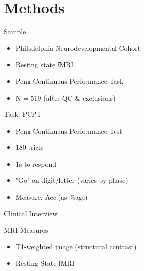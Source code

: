 \documentclass[presentation]{beamer}
\begin{document}
\section{Methods}
\label{sec:orgheadline14}
\begin{frame}[label={sec:orgheadline4}]{Sample}
\begin{itemize}
\item Philadelphia Neurodevelopmental Cohort
\item Resting state fMRI
\item Penn Continuous Performance Task
\item N = 519 (after QC \& exclusions)
\end{itemize}
\end{frame}
\begin{frame}[label={sec:orgheadline5}]{Task: PCPT}
\begin{itemize}
\item Penn Continuous Performance Test
\item 180 trials
\item 1s to respond
\item "Go" on digit/letter (varies by phase)
\item Measure: Acc (as \%age)
\end{itemize}
\end{frame}
\begin{frame}[label={sec:orgheadline6}]{Clinical Interview}
\end{frame}
\begin{frame}[label={sec:orgheadline7}]{MRI Measures}
\begin{itemize}
\item T1-weighted image (structural contrast)
\item Resting State fMRI
\end{itemize}
\end{frame}
\end{document}
